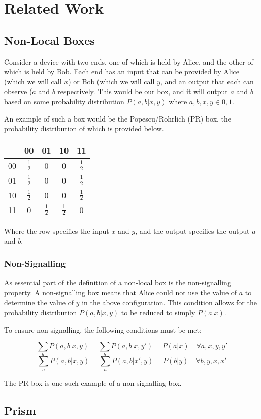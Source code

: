 \documentclass[report.tex]{subfiles}
\begin{document}
\chapter{Related Work} %
\label{cha:related_work}
\section{Non-Local Boxes} %
\label{sec:non_local_boxes}
Consider a device with two ends, one of which is held by Alice, and the other of
which is held by Bob. Each end has an input that can be provided by Alice (which
we will call \(x\)) or Bob (which we will call \(y\), and an output that each
can observe (\(a\) and \(b\) respectively. This would be our box, and it will
output \(a\) and \(b\) based on some probability distribution \(P(a, b | x, y)\)
where \(a, b, x, y \in {0, 1}\).

An example of such a box would be the Popescu/Rohrlich (PR) box, the probability
distribution of which is provided below.

\begin{center}
\begin{tabular}{l | c c c c}
  & 00 & 01 & 10 & 11 \\
  \hline
  00 & \(\frac{1}{2}\) & 0 & 0 & \(\frac{1}{2}\) \\
  01 & \(\frac{1}{2}\) & 0 & 0 & \(\frac{1}{2}\) \\
  10 & \(\frac{1}{2}\) & 0 & 0 & \(\frac{1}{2}\) \\
  11 & 0 & \(\frac{1}{2}\) & \(\frac{1}{2}\) & 0 \\
\end{tabular}
\end{center}

Where the row specifies the input \(x\) and \(y\), and the output specifies the
output \(a\) and \(b\).

\subsection{Non-Signalling} %
\label{sub:non_signalling}
As essential part of the definition of a non-local box is the non-signalling
property. A non-signalling box means that Alice could not use the value of \(a\)
to determine the value of \(y\) in the above configuration. This condition
allows for the probability distribution \(P(a, b | x, y)\) to be reduced to
simply \(P(a|x)\).

To ensure non-signalling, the following conditions must be met:

\[\sum_{b} P(a, b | x, y) = \sum_{b} P(a, b | x, y') = P(a | x) 
\quad \forall a, x, y, y'\]
\[\sum_{a} P(a, b | x, y) = \sum_{a} P(a, b | x', y) = P(b | y) 
\quad \forall b, y, x, x'\]

The PR-box is one such example of a non-signalling box.

\section{Prism} %
\label{sec:prism}


\newpage
\end{document}
